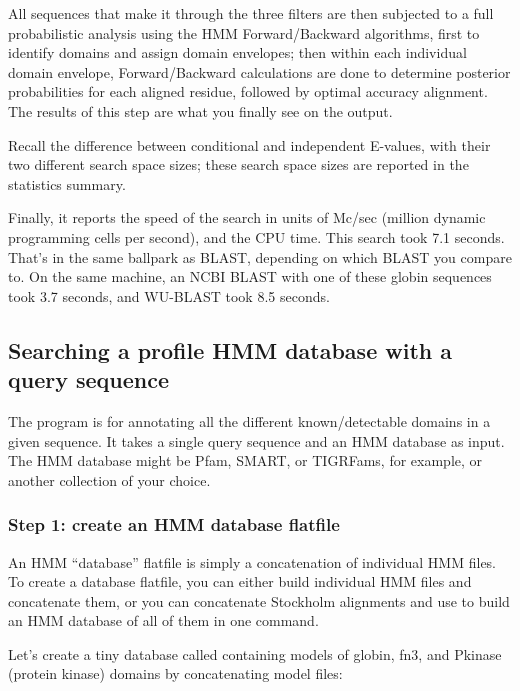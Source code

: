 All sequences that make it through the three filters are then
subjected to a full probabilistic analysis using the HMM
Forward/Backward algorithms, first to identify domains and assign
domain envelopes; then within each individual domain envelope,
Forward/Backward calculations are done to determine posterior
probabilities for each aligned residue, followed by optimal accuracy
alignment. The results of this step are what you finally see on the
output.

Recall the difference between conditional and independent E-values,
with their two different search space sizes; these search space sizes
are reported in the statistics summary. 

Finally, it reports the speed of the search in units of Mc/sec
(million dynamic programming cells per second), and the CPU time.
This search took 7.1 seconds. That's in the same ballpark as BLAST,
depending on which BLAST you compare to. On the same machine, an NCBI
BLAST with one of these globin sequences took 3.7 seconds, and
WU-BLAST took 8.5 seconds.


\subsection{Searching a profile HMM database with a query sequence}

The  program is for annotating all the different
known/detectable domains in a given sequence. It takes a single query
sequence and an HMM database as input. The HMM database might be Pfam,
SMART, or TIGRFams, for example, or another collection of your choice.

\subsubsection{Step 1: create an HMM database flatfile}

An HMM ``database'' flatfile is simply a concatenation of individual
HMM files. To create a database flatfile, you can either build
individual HMM files and concatenate them, or you can concatenate
Stockholm alignments and use  to build an HMM database
of all of them in one command. 

Let's create a tiny database called  containing models
of globin, fn3, and Pkinase (protein kinase) domains by concatenating
model files:

\\
\\
\\

